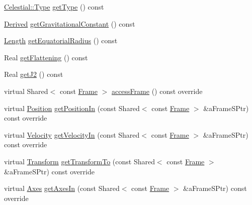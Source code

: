 \begin{DoxyCompactItemize}
\item 
\hyperlink{classlibrary_1_1physics_1_1env_1_1obj_1_1_celestial_aab1f58aa727e639288d65f3d33c4f245}{Celestial\+::\+Type} \hyperlink{classlibrary_1_1physics_1_1env_1_1obj_1_1_celestial_ae020ad574249ea82679347c0a6933355}{get\+Type} () const
\item 
\hyperlink{classlibrary_1_1physics_1_1units_1_1_derived}{Derived} \hyperlink{classlibrary_1_1physics_1_1env_1_1obj_1_1_celestial_a3c7c4b64ec4b37e311fe914b4ea5b9d1}{get\+Gravitational\+Constant} () const
\item 
\hyperlink{classlibrary_1_1physics_1_1units_1_1_length}{Length} \hyperlink{classlibrary_1_1physics_1_1env_1_1obj_1_1_celestial_a7dd4326ff317292262d1a9adf8887cfe}{get\+Equatorial\+Radius} () const
\item 
Real \hyperlink{classlibrary_1_1physics_1_1env_1_1obj_1_1_celestial_aac48ed47a25a10c120f066995dc3c6d4}{get\+Flattening} () const
\item 
Real \hyperlink{classlibrary_1_1physics_1_1env_1_1obj_1_1_celestial_a3740b398dca520bd50862f67c29ab8e7}{get\+J2} () const
\item 
virtual Shared$<$ const \hyperlink{classlibrary_1_1physics_1_1coord_1_1_frame}{Frame} $>$ \hyperlink{classlibrary_1_1physics_1_1env_1_1obj_1_1_celestial_a6649bfe0bf0795aa4def046a8c38aef5}{access\+Frame} () const override
\item 
virtual \hyperlink{classlibrary_1_1physics_1_1coord_1_1_position}{Position} \hyperlink{classlibrary_1_1physics_1_1env_1_1obj_1_1_celestial_aa2a209f37414e24303c21d994396664f}{get\+Position\+In} (const Shared$<$ const \hyperlink{classlibrary_1_1physics_1_1coord_1_1_frame}{Frame} $>$ \&a\+Frame\+S\+Ptr) const override
\item 
virtual \hyperlink{classlibrary_1_1physics_1_1coord_1_1_velocity}{Velocity} \hyperlink{classlibrary_1_1physics_1_1env_1_1obj_1_1_celestial_accaa3b1fdc39a1a058fd35006f31982d}{get\+Velocity\+In} (const Shared$<$ const \hyperlink{classlibrary_1_1physics_1_1coord_1_1_frame}{Frame} $>$ \&a\+Frame\+S\+Ptr) const override
\item 
virtual \hyperlink{classlibrary_1_1physics_1_1coord_1_1_transform}{Transform} \hyperlink{classlibrary_1_1physics_1_1env_1_1obj_1_1_celestial_ac6676b10ebbb63a8483137c9c734c58a}{get\+Transform\+To} (const Shared$<$ const \hyperlink{classlibrary_1_1physics_1_1coord_1_1_frame}{Frame} $>$ \&a\+Frame\+S\+Ptr) const override
\item 
virtual \hyperlink{classlibrary_1_1physics_1_1coord_1_1_axes}{Axes} \hyperlink{classlibrary_1_1physics_1_1env_1_1obj_1_1_celestial_a51d7ed3c0dcf627fbbcd81f9b190fb6b}{get\+Axes\+In} (const Shared$<$ const \hyperlink{classlibrary_1_1physics_1_1coord_1_1_frame}{Frame} $>$ \&a\+Frame\+S\+Ptr) const override

\end{DoxyCompactItemize}

